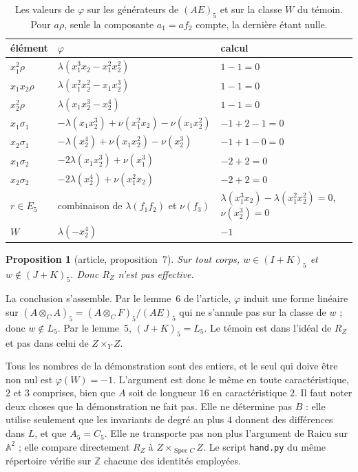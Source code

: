 \documentclass[11pt,a4paper]{amsart}
\theoremstyle{definition}
\theoremstyle{plain}
\newtheorem*{proposition}{Proposition}
\theoremstyle{remark}
\newcommand{\A}{\mathbb A}
\newcommand{\Z}{\mathbb Z}
\newcommand{\Spec}{\operatorname{Spec}}
\begin{document}
\begin{table}[htbp]
\centering
\begin{tabular}{@{}lll@{}}
\toprule
élément & $\varphi$ & calcul \\
\midrule
$x_1^2\rho$ & $\lambda(x_1^3x_2 - x_1^2x_2^2)$ & $1 - 1 = 0$ \\
$x_1x_2\rho$ & $\lambda(x_1^2x_2^2 - x_1x_2^3)$ & $1 - 1 = 0$ \\
$x_2^2\rho$ & $\lambda(x_1x_2^3 - x_2^4)$ & $1 - 1 = 0$ \\
$x_1\sigma_1$ & $-\lambda(x_1x_2^3) + \nu(x_1^2x_2) - \nu(x_1x_2^2)$ & $-1 + 2 - 1 = 0$ \\
$x_2\sigma_1$ & $-\lambda(x_2^4) + \nu(x_1x_2^2) - \nu(x_2^3)$ & $-1 + 1 - 0 = 0$ \\
$x_1\sigma_2$ & $-2\lambda(x_1x_2^3) + \nu(x_1^3)$ & $-2 + 2 = 0$ \\
$x_2\sigma_2$ & $-2\lambda(x_2^4) + \nu(x_1^2x_2)$ & $-2 + 2 = 0$ \\
$r \in E_5$ & combinaison de $\lambda(f_1f_2)$ et $\nu(f_3)$ & $\lambda(x_1^3x_2) - \lambda(x_1^2x_2^2) = 0$, $\nu(x_2^3) = 0$ \\
\midrule
$W$ & $\lambda(-x_2^4)$ & $-1$ \\
\bottomrule
\end{tabular}
\medskip
\caption{Les valeurs de $\varphi$ sur les générateurs de $(AE)_5$ et sur la classe $W$ du témoin. Pour $a\rho$, seule la composante $a_1 = af_2$ compte, la dernière étant nulle.}\label{tab:phi}
\end{table}

\begin{proposition}[article, proposition~7]
Sur tout corps, $w \in (I + K)_5$ et $w \notin (J + K)_5$. Donc $R_Z$ n'est pas effective.
\end{proposition}

La conclusion s'assemble. Par le lemme~6 de l'article, $\varphi$ induit une forme linéaire sur $(A \otimes_C A)_5 = (A \otimes_C F)_5/(AE)_5$ qui ne s'annule pas sur la classe de $w$ ; donc $w \notin L_5$. Par le lemme~5, $(J + K)_5 = L_5$. Le témoin est dans l'idéal de $R_Z$ et pas dans celui de $Z \times_Y Z$.

Tous les nombres de la démonstration sont des entiers, et le seul qui doive être non nul est $\varphi(W) = -1$. L'argument est donc le même en toute caractéristique, $2$ et $3$ comprises, bien que $A$ soit de longueur $16$ en caractéristique $2$. Il faut noter deux choses que la démonstration ne fait pas. Elle ne détermine pas $B$ : elle utilise seulement que les invariants de degré au plus $4$ donnent des différences dans $L$, et que $A_5 = C_5$. Elle ne transporte pas non plus l'argument de Raicu sur $\A^2$ ; elle compare directement $R_Z$ à $Z \times_{\Spec C} Z$. Le script \texttt{hand.py} du même répertoire vérifie sur $\Z$ chacune des identités employées.
\end{document}
